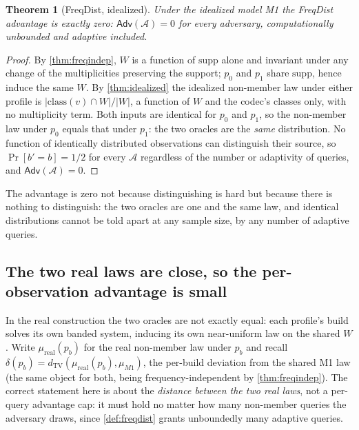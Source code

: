 \documentclass[11pt]{article}
\theoremstyle{definition}
\theoremstyle{plain}
\newtheorem{theorem}{Theorem}[section]
\theoremstyle{remark}
\newcommand{\TV}{d_{\mathrm{TV}}}
\newcommand{\class}{\mathrm{class}}
\newcommand{\W}{W}                          %
\newcommand{\supp}{\mathrm{supp}}           %
\newcommand{\Adv}{\mathsf{Adv}}             %
\newcommand{\lawreal}{\mu_{\mathrm{real}}}  %
\newcommand{\lawM}{\mu_{M1}}                %
\newcommand{\inter}{\cap}
\begin{document}
\begin{theorem}[FreqDist, idealized]
\label{thm:freqdist-ideal}
Under the idealized model M1 the FreqDist advantage is exactly zero:
$\Adv(\mathcal{A}) = 0$ for every adversary, computationally unbounded and adaptive
included.
\end{theorem}

\begin{proof}
By \cref{thm:freqindep}, $\W$ is a function of $\supp$ alone and invariant under any
change of the multiplicities preserving the support; $p_0$ and $p_1$ share $\supp$, hence
induce the same $\W$. By \cref{thm:idealized} the idealized non-member law under either
profile is $|\class(v) \inter \W|/|\W|$, a function of $\W$ and the codec's classes only,
with no multiplicity term. Both inputs are identical for $p_0$ and $p_1$, so the
non-member law under $p_0$ equals that under $p_1$: the two oracles are the \emph{same}
distribution. No function of identically distributed observations can distinguish their
source, so $\Pr[b' = b] = 1/2$ for every $\mathcal{A}$ regardless of the number or
adaptivity of queries, and $\Adv(\mathcal{A}) = 0$.
\end{proof}

The advantage is zero not because distinguishing is hard but because there is nothing to
distinguish: the two oracles are one and the same law, and identical distributions cannot
be told apart at any sample size, by any number of adaptive queries.

\subsection{The two real laws are close, so the per-observation advantage is small}

In the real construction the two oracles are not exactly equal: each profile's build
solves its own banded system, inducing its own near-uniform law on the shared $\W$. Write
$\lawreal(p_b)$ for the real non-member law under $p_b$ and recall
$\delta(p_b) = \TV(\lawreal(p_b), \lawM)$, the per-build deviation from the shared M1 law
(the same object for both, being frequency-independent by \cref{thm:freqindep}). The
correct statement here is about the \emph{distance between the two real laws}, not a
per-query advantage cap: it must hold no matter how many non-member queries the adversary
draws, since \cref{def:freqdist} grants unboundedly many adaptive queries.
\end{document}
